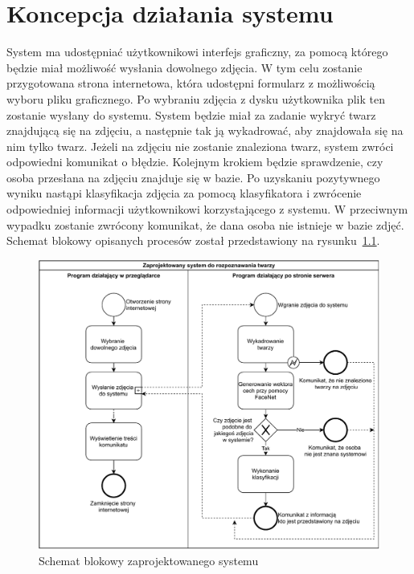 \chapter{Koncepcja działania systemu}

System ma udostępniać użytkownikowi interfejs graficzny,
za pomocą którego będzie miał możliwość wysłania dowolnego zdjęcia.
W tym celu zostanie przygotowana strona internetowa,
która udostępni formularz z możliwością wyboru pliku graficznego.
Po wybraniu zdjęcia z dysku użytkownika plik ten zostanie wysłany do systemu.
System będzie miał za zadanie wykryć twarz znajdującą się na zdjęciu,
a następnie tak ją wykadrować, aby znajdowała się na nim tylko twarz.
Jeżeli na zdjęciu nie zostanie znaleziona twarz, system zwróci odpowiedni komunikat o błędzie.
Kolejnym krokiem będzie sprawdzenie, czy osoba przesłana na zdjęciu znajduje się w bazie.
Po uzyskaniu pozytywnego wyniku nastąpi klasyfikacja zdjęcia za pomocą klasyfikatora
i zwrócenie odpowiedniej informacji użytkownikowi korzystającego z systemu.
W przeciwnym wypadku zostanie zwrócony komunikat, że dana osoba nie istnieje w bazie zdjęć.
Schemat blokowy opisanych procesów został przedstawiony na rysunku~\ref{fig:schemat_blokowy_systemu}.


\begin{figure}[]
    \centering
    \includegraphics[width=1\textwidth]{images/schemat_blokowy_systemu}
    \caption{Schemat blokowy zaprojektowanego systemu}
    \customsource
    \label{fig:schemat_blokowy_systemu}
\end{figure}